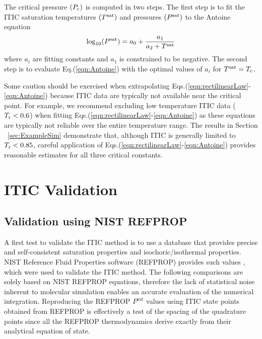 \documentclass[5p,times]{elsarticle}
\begin{document}
The critical pressure $(P_{\rm c})$ is computed in two steps. The first step is to fit the ITIC saturation temperatures $(T^{\rm sat})$ and pressures $(P^{\rm sat})$ to the Antoine equation \cite{rowlinson2013liquids}
\begin{equation} \label{eqn:Antoine}
\log_{10}(P^{\rm sat}) = a_0 + \frac{a_1}{a_2 + T^{\rm sat}}
\end{equation} 
where $a_i$ are fitting constants and $a_1$ is constrained to be negative. The second step is to evaluate Eq.(\ref{eqn:Antoine}) with the optimal values of $a_i$ for $T^{\rm sat} = T_{\rm c}$. 

Some caution should be exercised when extrapolating Eqs.(\ref{eqn:rectilinearLaw}-\ref{eqn:Antoine}) because ITIC data are typically not available near the critical point. For example, we recommend excluding low temperature ITIC data ($T_{\rm r} < 0.6$) when fitting Eqs.(\ref{eqn:rectilinearLaw}-\ref{eqn:Antoine}) as these equations are typically not reliable over the entire temperature range. The results in Section ~\ref{sec:ExampleSim} demonstrate that, although ITIC is generally limited to $T_{\rm r} < 0.85$, careful application of Eqs.(\ref{eqn:rectilinearLaw}-\ref{eqn:Antoine}) provides reasonable estimates for all three critical constants.








\section{ITIC Validation}\label{sec:NIST-VAL}
\subsection{Validation using NIST REFPROP} 
A first test to validate the ITIC method is to use a database that provides precise and self-consistent saturation properties and isochoric/isothermal properties. NIST Reference Fluid Properties software (REFPROP) provides such values \cite{LEMMON-RP91}, which were used to validate the ITIC method. The following comparisons are solely based on NIST REFPROP equations, therefore the lack of statistical noise inherent to molecular simulation enables an accurate evaluation of the numerical integration. Reproducing the REFPROP $P^{\mathrm{sat}}$ values using ITIC state points obtained from REFPROP is effectively a test of the spacing of the quadrature points since all the REFPROP thermodynamics derive exactly from their analytical equation of state.
\end{document}
